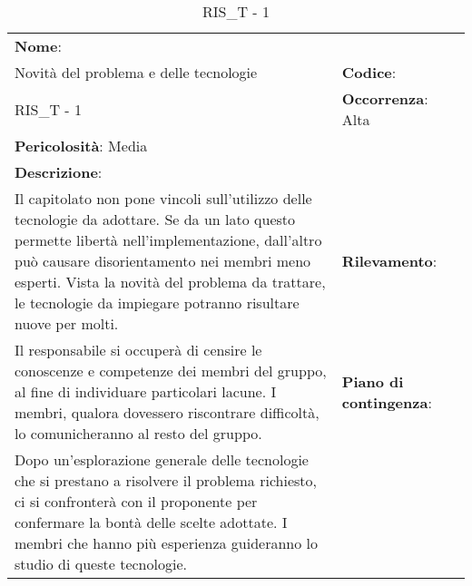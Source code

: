 \renewcommand{\arraystretch}{1.5}
\begin{longtable} { 
		>{\raggedright}p{} 
		>{\raggedright}p{} 
		>{\raggedright}p{}    }
		
		\caption{RIS\_T - 1} \endhead	


	\textbf{Nome}: \\ Novità del problema e delle tecnologie
	& \textbf{Codice}: \\ RIS\_T - 1  
	& \textbf{Occorrenza}: Alta \\ \textbf{Pericolosità}: Media
	
	\tabularnewline
	
	\textbf{Descrizione}: \\ Il capitolato non pone vincoli sull'utilizzo delle tecnologie da adottare. Se da un lato questo permette libertà nell'implementazione, dall'altro può causare disorientamento nei membri meno esperti. Vista la novità del problema da trattare, le tecnologie da impiegare potranno risultare nuove per molti.
	& 
	\textbf{Rilevamento}: \\ Il responsabile si occuperà di censire le conoscenze e competenze dei membri del gruppo, al fine di individuare particolari lacune. I membri, qualora dovessero riscontrare difficoltà, lo comunicheranno al resto del gruppo. 	
	&  
	\textbf{Piano di contingenza}: \\ Dopo un'esplorazione generale delle tecnologie che si prestano a risolvere il problema richiesto, ci si confronterà con il proponente per confermare la bontà delle scelte adottate. I membri che hanno più esperienza guideranno lo studio di queste tecnologie.

\end{longtable}

\newpage



